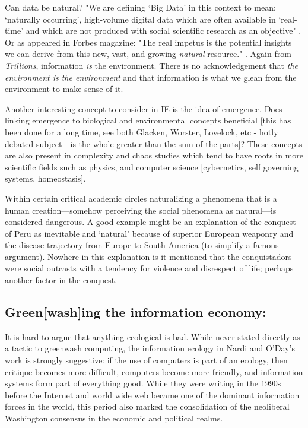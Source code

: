 Can data be natural? "We are defining ‘Big Data’ in this context to mean: ‘naturally occurring’, high-volume digital data which are often available in ‘real-time’ and which are not produced with social scientific research as an objective" \citep{ncrm_2015}. Or as appeared in Forbes magazine: "The real impetus is the potential insights we can derive from this new, vast, and growing \textit{natural} resource." \citep[][emphasis ours]{rotella_2012}. Again from \textit{Trillions}, information \textit{is} the environment. There is no acknowledgement that \textit{the environment is the environment} and that information is what we glean from the environment to make sense of it.

Another interesting concept to consider in IE is the idea of emergence. Does linking emergence to biological and environmental concepts beneficial [this has been done for a long time, see both Glacken, Worster, Lovelock, etc - hotly debated subject - is the whole greater than the sum of the parts]? These concepts are also present in complexity and chaos studies which tend to have roots in more scientific fields such as physics, and computer science [cybernetics, self governing systems, homeostasis].

Within certain critical academic circles naturalizing a phenomena that is a human creation—somehow perceiving the social phenomena as natural—is considered dangerous. A good example might be an explanation of the conquest of Peru as inevitable and ‘natural’ because of superior European weaponry and the disease trajectory from Europe to South America (to simplify a famous argument). Nowhere in this explanation is it mentioned that the conquistadors were social outcasts with a tendency for violence and disrespect of life; perhaps another factor in the conquest. 

\subsection{Green[wash]ing the information economy:}

It is hard to argue that anything ecological is bad. While never stated directly as a tactic to greenwash computing, the information ecology in Nardi and O'Day's work is strongly suggestive: if the use of computers is part of an ecology, then critique becomes more difficult, computers become more friendly, and information systems form part of everything good. While they were writing in the 1990s before the Internet and world wide web became one of the dominant information forces in the world, this period also marked the consolidation of the neoliberal Washington consensus in the economic and political realms.

